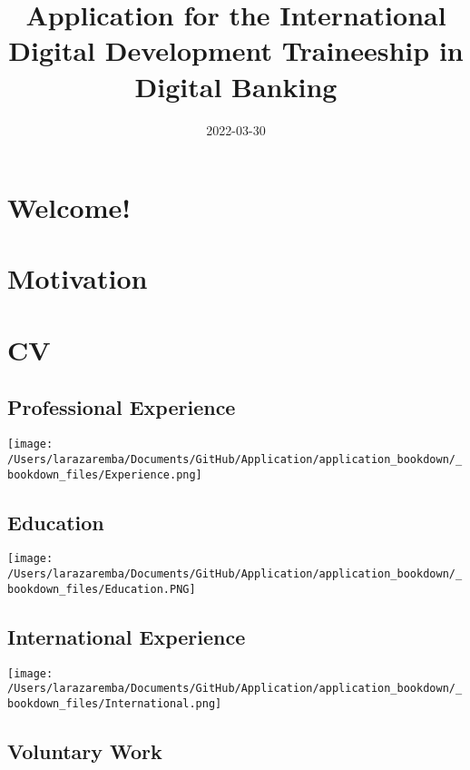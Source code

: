 \documentclass[
]{book}
\title{Application for the International Digital Development Traineeship in Digital Banking}
\author{}
\date{\vspace{-2.5em}2022-03-30}
\begin{document}
\maketitle

{
\setcounter{tocdepth}{1}
\tableofcontents
}
\hypertarget{welcome}{%
\chapter{Welcome!}\label{welcome}}

\hypertarget{motivation}{%
\chapter{Motivation}\label{motivation}}

\hypertarget{cv}{%
\chapter{CV}\label{cv}}

\hypertarget{professional-experience}{%
\section{Professional Experience}\label{professional-experience}}

\texttt{[image: /Users/larazaremba/Documents/GitHub/Application/application\_bookdown/\_bookdown\_files/Experience.png]}

\hypertarget{education}{%
\section{Education}\label{education}}

\texttt{[image: /Users/larazaremba/Documents/GitHub/Application/application\_bookdown/\_bookdown\_files/Education.PNG]}

\hypertarget{international-experience}{%
\section{International Experience}\label{international-experience}}

\texttt{[image: /Users/larazaremba/Documents/GitHub/Application/application\_bookdown/\_bookdown\_files/International.png]}

\hypertarget{voluntary-work}{%
\section{Voluntary Work}\label{voluntary-work}}
\end{document}
